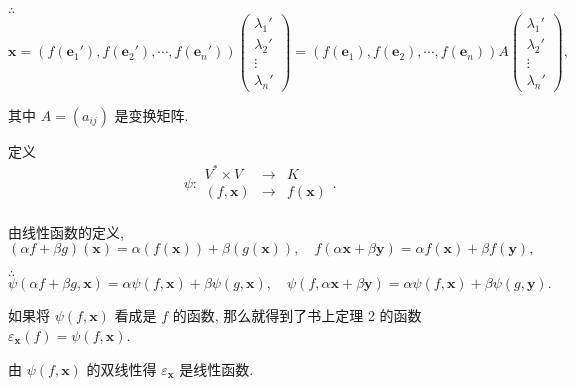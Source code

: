 \documentclass{ctexart}
\begin{document}
$\therefore$
\[\boldsymbol{x}=(f(\boldsymbol{e}_1'),f(\boldsymbol{e}_2'),\cdots,f(\boldsymbol{e}_n'))\begin{pmatrix}
    \lambda_1' \\
    \lambda_2' \\
    \vdots \\
    \lambda_n'
\end{pmatrix}=(f(\boldsymbol{e}_1),f(\boldsymbol{e}_2),\cdots,f(\boldsymbol{e}_n))A\begin{pmatrix}
    \lambda_1' \\
    \lambda_2' \\
    \vdots \\
    \lambda_n'
\end{pmatrix},\]

其中 $A=(a_{ij})$ 是变换矩阵.

定义
\[\psi:\begin{array}{rcl}
    V^*\times V & \to & K \\
    (f,\boldsymbol{x}) & \to & f(\boldsymbol{x}) \\
\end{array}.\]

由线性函数的定义,
\[(\alpha f+\beta g)(\boldsymbol{x})=\alpha(f(\boldsymbol{x}))+\beta(g(\boldsymbol{x})),\quad f(\alpha\boldsymbol{x}+\beta\boldsymbol{y})=\alpha f(\boldsymbol{x})+\beta f(\boldsymbol{y}),\]

$\therefore$
\[\psi(\alpha f+\beta g,\boldsymbol{x})=\alpha\psi(f,\boldsymbol{x})+\beta\psi(g,\boldsymbol{x}),\quad\psi(f,\alpha\boldsymbol{x}+\beta\boldsymbol{y})=\alpha\psi(f,\boldsymbol{x})+\beta\psi(g,\boldsymbol{y}).\]

如果将 $\psi(f,\boldsymbol{x})$ 看成是 $f$ 的函数, 那么就得到了书上定理 2 的函数 $\varepsilon_{\boldsymbol{x}}(f)=\psi(f,\boldsymbol{x})$.

由 $\psi(f,\boldsymbol{x})$ 的双线性得 $\varepsilon_{\boldsymbol{x}}$ 是线性函数.
\end{document}
